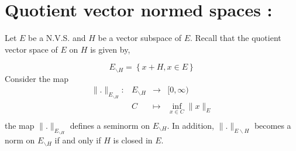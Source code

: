 \chapter{Quotient vector normed spaces :}

Let $E $ be a N.V.S. and $H $ be a vector subspace of $E $. Recall that 
the quotient vector space of $E $ on $H $ is given by, 

\[
E_{ \backslash H}= 
\left\{ x + H, x \in  E \right\} 
\]
Consider the map 
\[
\begin{array}{cccc}
	\| . \| _{E _{ \backslash H}} : &  E_{ \backslash H}  & \longrightarrow & [0,\infty ) \\

           &    C & \longmapsto     &  \inf_{ x \in  C} \| x \| _{E}\\ 
\end{array}
\]
the map $\| . \| _{E _{ \backslash H}} $  defines a seminorm 
on $E _{ \backslash  H} $. In addition, $\| . \| _{E \backslash H} $  
becomes a norm on $E _{ \backslash H} $ if and only if $H$ 
is closed in $E$.
